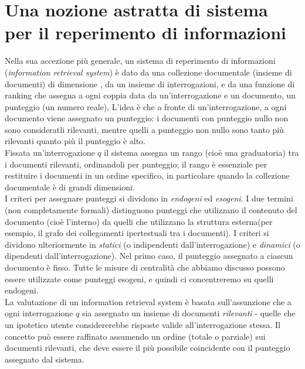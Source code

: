 \section{Una nozione astratta di sistema per il reperimento di informazioni}
Nella sua accezione più generale, un sistema di reperimento di informazioni (\textit{information retrieval system}) è dato da una collezione documentale  (insieme di documenti) di dimensione , da un insieme  di interrogazioni, e da una funzione di ranking  che assegna a ogni coppia data da un'interrogazione e un documento, un punteggio (un numero reale), L'idea è che a fronte di un'interrogazione, a ogni documento viene assegnato un punteggio: i documenti con punteggio nullo non sono consideratli rilevanti, mentre quelli a punteggio non nullo sono tanto più rilevanti quanto più il punteggio è alto.\\
Fissata un'interrogazione $q$ il sistema assegna un rango (cioè una graduatoria) tra i documenti rilevanti, ordinandoli per punteggio; il rango è essenziale per restituire i documenti in un ordine specifico, in particolare quando la collezione documentale è di grandi dimensioni.\\
I criteri per assegnare punteggi si dividono in \textit{endogeni} ed \textit{esogeni}. I due termini (non completamente formali) distinguono punteggi che utilizzano il contenuto del documento (cioè l'interno) da quelli che utilizzano la struttura esterna(per esempio, il grafo dei collegamenti ipertestuali tra i documenti). I criteri si dividono ulteriormente in \textit{statici} (o indipendenti dall'interrogazione) e \textit{dinamici} (o dipendenti dall'interrogazione). Nel primo caso, il punteggio assegnato a ciascun documento è fisso. Tutte le misure di centralità che abbiamo discusso possono essere utilizzate come punteggi esogeni, e quindi ci concentreremo su quelli endogeni.\\
La valutazione di un information retrieval system è basata sull'assunzione che a ogni interrogazione $q$ sia assegnato un insieme di documenti \textit{rilevanti} - quelle che un ipotetico utente considererebbe risposte valide all'interrogazione stessa. Il concetto può essere raffinato assumendo un ordine (totale o parziale) sui documenti rilevanti, che deve essere il più possibile coincidente con il punteggio assegnato dal sistema.